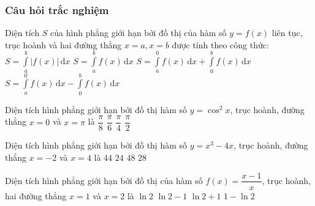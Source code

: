 \subsubsection{Câu hỏi trắc nghiệm}
\begin{ex}%
	Diện tích $S$ của hình phẳng giới hạn bởi đồ thị của hàm số $y=f(x)$ liên tục, trục hoành và hai đường thẳng $x=a, x=b$ được tính theo công thức: 
	\choice
	{\True $S=\displaystyle\int\limits_a^b\left|f(x)\right|\mathrm{\,d}x$}
	{$S=\displaystyle\int\limits_a^b f(x)\mathrm{\,d}x$}
	{$S=\displaystyle\int\limits_a^0 f(x)\mathrm{\,d}x+\displaystyle\int\limits_0^b f(x)\mathrm{\,d}x$}
	{$S=\displaystyle\int\limits_a^0 f(x)\mathrm{\,d}x-\displaystyle\int\limits_0^b f(x)\mathrm{\,d}x$}
\end{ex}
\begin{ex}%
	Diện tích hình phẳng giới hạn bởi đồ thị hàm số $y=\cos^2x$, trục hoành, đường thẳng $x=0$ và $x=\pi$ là 
	\choice
	{$\dfrac{\pi}{8}$}
	{$\dfrac{\pi}{6}$}
	{$\dfrac{\pi}{4}$}
	{\True $\dfrac{\pi}{2}$}
\end{ex}
\begin{ex}%
	Diện tích hình phẳng giới hạn bởi đồ thị hàm số $y=x^3-4x$, trục hoành, đường thẳng $x=-2$ và $x=4$ là 
	\choice
	{\True $44$}
	{$24$}
	{$48$}
	{$28$}
\end{ex}
\begin{ex}%
	Diện tích hình phẳng giới hạn bởi đồ thị của hàm số $f(x)=\dfrac{x-1}{x}$, trục hoành, hai đường thẳng $x=1$ và $x=2$ là 
	\choice
	{$\ln 2$}
	{$\ln 2-1$}
	{$\ln 2+1$}
	{\True $1-\ln 2$}
\end{ex}
